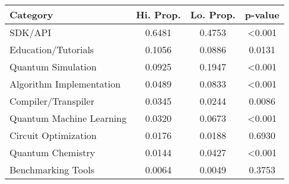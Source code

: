 \begin{tabular}{|l|c|c|c|}
\hline
Category & Hi. Prop. & Lo. Prop. & p-value \\
\hline \hline
SDK/API & 0.6481 & 0.4753 & \textless{}0.001 \\
Education/Tutorials & 0.1056 & 0.0886 & 0.0131 \\
Quantum Simulation & 0.0925 & 0.1947 & \textless{}0.001 \\
Algorithm Implementation & 0.0489 & 0.0833 & \textless{}0.001 \\
Compiler/Transpiler & 0.0345 & 0.0244 & 0.0086 \\
Quantum Machine Learning & 0.0320 & 0.0673 & \textless{}0.001 \\
Circuit Optimization & 0.0176 & 0.0188 & 0.6930 \\
Quantum Chemistry & 0.0144 & 0.0427 & \textless{}0.001 \\
Benchmarking Tools & 0.0064 & 0.0049 & 0.3753 \\
\hline
\end{tabular}